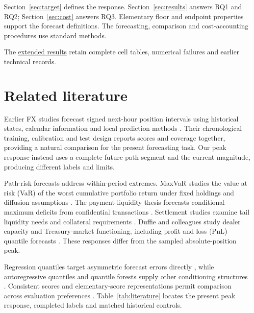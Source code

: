 \documentclass[12pt,a4paper]{article}
\begin{document}
Section~\ref{sec:target} defines the response. Section~\ref{sec:results} answers RQ1 and RQ2; Section~\ref{sec:cost} answers RQ3. Elementary floor and endpoint properties support the forecast definitions. The forecasting, comparison and cost-accounting procedures use standard methods.

\FloatBarrier

The \href{https://github.com/ByronLi0207/financial-mathematics-paper-20261020/blob/submission-final/EXTENDED_RESULTS.md}{extended results} retain complete cell tables, numerical failures and earlier technical records.

\section{Related literature}\label{sec:literature}

Earlier FX studies forecast signed next-hour position intervals using historical states, calendar information and local prediction methods \cite{wisniewski2020,wisniewski2024}. Their chronological training, calibration and test design reports scores and coverage together, providing a natural comparison for the present forecasting task. Our peak response instead uses a complete future path segment and the current magnitude, producing different labels and limits.


Path-risk forecasts address within-period extremes. MaxVaR studies the value at risk (VaR) of the worst cumulative portfolio return under fixed holdings and diffusion assumptions \cite{boudoukh2004}. The payment-liquidity thesis forecasts conditional maximum deficits from confidential transactions \cite{hoogen2017}. Settlement studies examine tail liquidity needs and collateral requirements \cite{petrunia2019,arjani2020}. Duffie and colleagues study dealer capacity and Treasury-market functioning, including profit and loss (PnL) quantile forecasts \cite{duffie2023}. These responses differ from the sampled absolute-position peak.


Regression quantiles target asymmetric forecast errors directly \cite{koenker1978}, while autoregressive quantiles and quantile forests supply other conditioning structures \cite{engle2004,meinshausen2006}. Consistent scores and elementary-score representations permit comparison across evaluation preferences \cite{gneiting2011,ehm2016}. Table~\ref{tab:literature} locates the present peak response, completed labels and matched historical controls.
\end{document}

